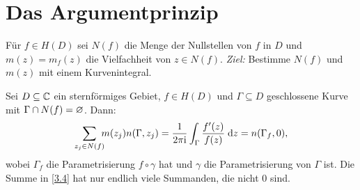 \documentclass[a4paper,twoside,DIV15,BCOR12mm]{scrbook}
\begin{document}
\section{Das Argumentprinzip}

Für $f\in H(D)$ sei $N(f)$ die Menge der Nullstellen von $f$ in $D$ und $m(z) = m_f(z)$ die Vielfachheit von $z\in N(f)$. \textit{Ziel:} Bestimme $N(f)$ und $m(z)$ mit einem Kurvenintegral.

\begin{thm}[Argumentprinzip]\label{thm3.16}
Sei $D\subseteq\mathbb{C}$ ein sternförmiges Gebiet, $f\in H(D)$ und $\Gamma\subseteq D$ geschlossene Kurve mit $\Gamma\cap N(f) = \varnothing$. Dann:
\begin{equation}\label{3.4}
\sum_{z_j\in N(f)}\!\!\! m(z_j)n(\Gamma,z_j) = \frac{1}{2\pi\mathrm{i}}\int_{\Gamma}^{}{\frac{f^\prime(z)}{f(z)}}\;\mathrm{d} z = n(\Gamma_f,0),
\end{equation}
wobei $\Gamma_f$ die Parametrisierung $f\circ\gamma$ hat und $\gamma$ die Parametrisierung von $\Gamma$ ist. Die Summe in \eqref{3.4} hat nur endlich viele Summanden, die nicht 0 sind.
\end{thm}
\end{document}
